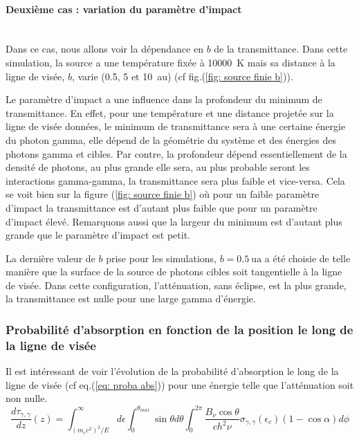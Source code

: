 \documentclass[a4paper,12pt,twoside]{article}
\begin{document}
\paragraph*{Deuxième cas : variation du paramètre d'impact} \hspace{0pt} \\
Dans ce cas, nous allons voir la dépendance en $b$ de la transmittance. Dans cette simulation, la source a une température fixée à \SI{10000}{\K} mais sa distance à la ligne de visée, $b$, varie (0.5, 5 et \SI{10}{\astronomicalunit}) (cf fig.(\ref{fig: source finie b})).

Le paramètre d'impact a une influence dans la profondeur du minimum de transmittance. En effet, pour une température et une distance projetée sur la ligne de visée données, le minimum de transmittance sera à une certaine énergie du photon gamma, elle dépend de la géométrie du système et des énergies des photons gamma et cibles. Par contre, la profondeur dépend essentiellement de la densité de photons, au plus grande elle sera, au plus probable seront les interactions gamma-gamma, la transmittance sera plus faible et vice-versa. Cela se voit bien sur la figure (\ref{fig: source finie b}) où pour un faible paramètre d'impact la transmittance est d'autant plus faible que pour un paramètre d'impact élevé. Remarquons aussi que la largeur du minimum est d'autant plus grande que le paramètre d'impact est petit.

La dernière valeur de $b$ prise pour les simulations, $b = \SI{0.5}{\astronomicalunit}$ a été choisie de telle manière que la surface de la source de photons cibles soit tangentielle à la ligne de visée. Dans cette configuration, l'atténuation, sans éclipse, est la plus grande, la transmittance est nulle pour une large gamma d'énergie.

\subsubsection{Probabilité d'absorption en fonction de la position le long de la ligne de visée}

Il est intéressant de voir l'évolution de la probabilité d'absorption le long de la ligne de visée (cf eq.(\ref{eq: proba abs})) pour une énergie telle que l'atténuation soit non nulle.
\begin{equation}
	\frac{d \tau_{\gamma,\gamma}}{d z} (z) = \int_{(m_e c^2)^2/E}^\infty d \epsilon \int_0^{\theta_{max}} \sin\theta d \theta \int_0^{2\pi} \frac{B_\nu \cos\theta}{c h^2 \nu} \sigma_{\gamma, \gamma}(\epsilon_c) (1 - \cos\alpha) d\phi
    \label{eq: proba abs}
\end{equation}
\end{document}
